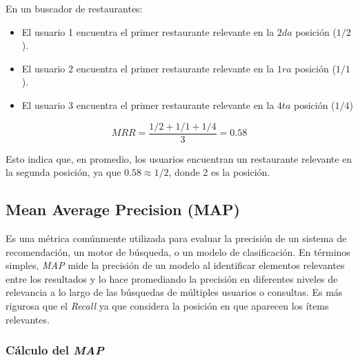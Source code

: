 \documentclass[11pt,a4paper,twoside]{thesis}
\begin{document}
En un buscador de restaurantes:
\begin{itemize}
	\item El usuario 1 encuentra el primer restaurante relevante en la $2da$ posición ($1/2$).
	\item El usuario 2 encuentra el primer restaurante relevante en la $1ra$ posición ($1/1$).
	\item El usuario 3 encuentra el primer restaurante relevante en la $4ta$ posición ($1/4$)
\end{itemize}

\begin{equation}
	MRR = \frac{1/2 + 1/1 + 1/4}{3} = 0.58
\end{equation}

Esto indica que, en promedio, los usuarios encuentran un restaurante relevante en la segunda posición, ya que $0.58 \approx 1/2$, donde 2 es la posición.


\subsection{Mean Average Precision (MAP)}

Es una métrica comúnmente utilizada para evaluar la precisión de un sistema de recomendación, un motor de búsqueda, o un modelo de clasificación. En términos simples, \textit{MAP} mide la precisión de un modelo al identificar elementos relevantes entre los resultados y lo hace promediando la precisión en diferentes niveles de relevancia a lo largo de las búsquedas de múltiples usuarios o consultas. Es más rigurosa que el \textit{Recall} ya que considera la posición en que aparecen los ítems relevantes.

\subsubsection{Cálculo del \textit{MAP}}
\end{document}
